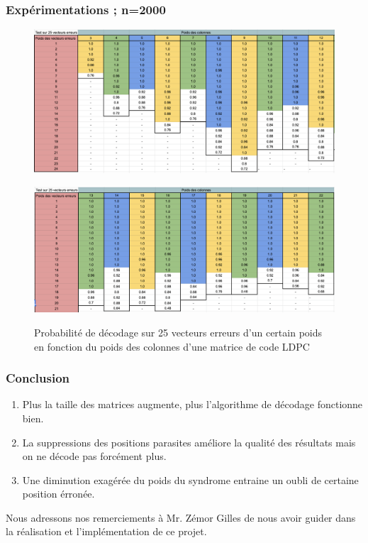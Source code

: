 \documentclass{beamer}
\begin{document}
    \begin{frame}
        \frametitle{Expérimentations ; n=2000}
        \begin{figure}[h!]
            \centering
            \includegraphics[scale=0.35]{res2000_1.png}
            \label{fig:res5}
        \end{figure}
        \begin{figure}[h!]
            \centering
            \includegraphics[scale=0.35]{res2000_2.png}
            \label{fig:res6}
            \caption{Probabilité de décodage sur 25 vecteurs erreurs d'un certain poids en fonction du poids des colonnes d'une matrice de code LDPC}
        \end{figure}
    \end{frame}

    \begin{frame}
        \frametitle{Conclusion}
        \begin{enumerate}
            \item Plus la taille des matrices augmente, plus l'algorithme de décodage fonctionne bien.
            \item La suppressions des positions parasites améliore la qualité des résultats mais on ne décode pas forcément plus.
            \item Une diminution exagérée du poids du syndrome entraine un oubli de certaine position érronée.
        \end{enumerate}
        \vspace{1cm}
        Nous adressons nos remerciements à Mr. Zémor Gilles de nous avoir guider dans la réalisation et l'implémentation de ce projet.

    \end{frame}
\end{document}
